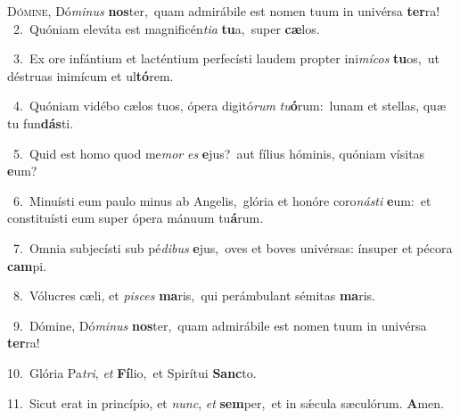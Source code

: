 \lettrine{\initial\textcolor{\initialcolor}{D}}{ómine,} Dó\-\textit{mi}\-\textit{nus} \textbf{nos}\-ter,~\star quam admirábile est nomen tuum in univérsa \textbf{ter}\-ra!\\
{\numbfont\textcolor{\numbcolor}{~2.}}~Quóniam eleváta est magnificén\-\textit{ti}\-\textit{a} \textbf{tu}\-a,~\star super \textbf{cæ}\-los.\par
{\numbfont\textcolor{\numbcolor}{~3.}}~Ex ore infántium et lacténtium perfecísti laudem propter ini\-\textit{mí}\-\textit{cos} \textbf{tu}\-os,~\star ut déstruas inimícum et ul\-\textbf{tó}\-rem.\par
{\numbfont\textcolor{\numbcolor}{~4.}}~Quóniam vidébo cælos tuos, ópera digitó\textit{rum} \textit{tu}\-\textbf{ó}rum:~\star lunam et stellas, quæ tu fun\-\textbf{dás}\-ti.\par
{\numbfont\textcolor{\numbcolor}{~5.}}~Quid est homo quod me\textit{mor} \textit{es} \textbf{e}\-jus?~\star aut fílius hóminis, quóniam vísitas \textbf{e}\-um?\par
{\numbfont\textcolor{\numbcolor}{~6.}}~Minuísti eum paulo minus ab Angelis,~\dagger glória et honóre coro\-\textit{nás}\-\textit{ti} \textbf{e}\-um:~\star et constituísti eum super ópera mánuum tu\-\textbf{á}\-rum.\par
{\numbfont\textcolor{\numbcolor}{~7.}}~Omnia subjecísti sub pé\-\textit{di}\-\textit{bus} \textbf{e}\-jus,~\star oves et boves univérsas: ínsuper et pécora \textbf{cam}\-pi.\par
{\numbfont\textcolor{\numbcolor}{~8.}}~Vólucres cæli, et \textit{pi}\-\textit{sces} \textbf{ma}\-ris,~\star qui perámbulant sémitas \textbf{ma}\-ris.\par
{\numbfont\textcolor{\numbcolor}{~9.}}~Dómine, Dó\-\textit{mi}\-\textit{nus} \textbf{nos}\-ter,~\star quam admirábile est nomen tuum in univérsa \textbf{ter}\-ra!\par
{\numbfont\textcolor{\numbcolor}{10.}}~Glória Pa\-\textit{tri}\-, \textit{et} \textbf{Fí}\-lio,~\star et Spirítui \textbf{Sanc}\-to.\par
{\numbfont\textcolor{\numbcolor}{11.}}~Sicut erat in princípio, et \textit{nunc}\-, \textit{et} \textbf{sem}\-per,~\star et in sǽcula sæculórum. \textbf{A}\-men.\par
